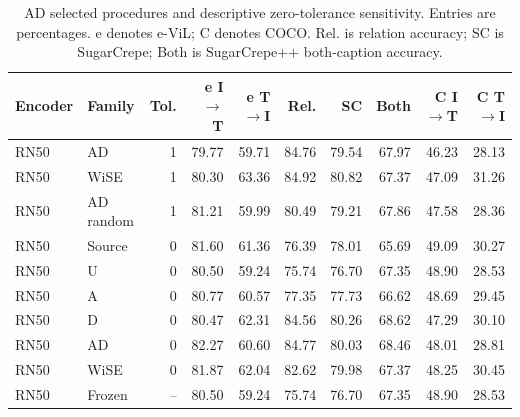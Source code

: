 \begin{table}[t]
\centering
\scriptsize
\setlength{\tabcolsep}{3pt}
\begin{tabular}{llrrrrrrrr}
\toprule
Encoder & Family & Tol. & e I$\to$T & e T$\to$I & Rel. & SC & Both & C I$\to$T & C T$\to$I\\
\midrule
RN50 & AD & 1 & 79.77 & 59.71 & 84.76 & 79.54 & 67.97 & 46.23 & 28.13\\
RN50 & WiSE & 1 & 80.30 & 63.36 & 84.92 & 80.82 & 67.37 & 47.09 & 31.26\\
RN50 & AD random & 1 & 81.21 & 59.99 & 80.49 & 79.21 & 67.86 & 47.58 & 28.36\\
RN50 & Source & 0 & 81.60 & 61.36 & 76.39 & 78.01 & 65.69 & 49.09 & 30.27\\
RN50 & U & 0 & 80.50 & 59.24 & 75.74 & 76.70 & 67.35 & 48.90 & 28.53\\
RN50 & A & 0 & 80.77 & 60.57 & 77.35 & 77.73 & 66.62 & 48.69 & 29.45\\
RN50 & D & 0 & 80.47 & 62.31 & 84.56 & 80.26 & 68.62 & 47.29 & 30.10\\
RN50 & AD & 0 & 82.27 & 60.60 & 84.77 & 80.03 & 68.46 & 48.01 & 28.81\\
RN50 & WiSE & 0 & 81.87 & 62.04 & 82.62 & 79.98 & 67.37 & 48.25 & 30.45\\
RN50 & Frozen & -- & 80.50 & 59.24 & 75.74 & 76.70 & 67.35 & 48.90 & 28.53\\
\bottomrule
\end{tabular}
\caption{AD selected procedures and descriptive zero-tolerance sensitivity. Entries are percentages. e denotes e-ViL; C denotes COCO. Rel. is relation accuracy; SC is SugarCrepe; Both is SugarCrepe++ both-caption accuracy.}\label{tab:admetrics18}
\end{table}


